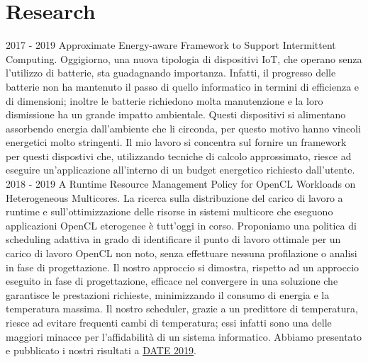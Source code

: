 \documentclass[letterpaper]{twentysecondcvit} %
\begin{document}
\section{Research}
\begin{twenty}
	\twentyitem
	{2017 - 2019}
	{}
	{Approximate Energy-aware Framework to Support Intermittent Computing.}
	{}
	{
	Oggigiorno, una nuova tipologia di dispositivi IoT, che operano senza l'utilizzo di batterie, sta guadagnando importanza. Infatti, il progresso delle batterie non ha mantenuto il passo di quello informatico in termini di efficienza e di dimensioni; inoltre le batterie richiedono molta manutenzione e la loro dismissione ha un grande impatto ambientale. Questi dispositivi si alimentano assorbendo energia dall'ambiente che li circonda, per questo motivo hanno vincoli energetici molto stringenti. Il mio lavoro si concentra sul fornire un framework per questi dispostivi che, utilizzando tecniche di calcolo approssimato, riesce ad eseguire un'applicazione all'interno di un budget energetico richiesto dall'utente.
	{
	}
	}
	{\footnotesize{}}
	\\
	\twentyitem
	{2018 - 2019}
	{}
	{A Runtime Resource Management Policy for OpenCL Workloads on Heterogeneous Multicores.}
	{}
	{
	La ricerca sulla distribuzione del carico di lavoro a runtime e sull’ottimizzazione delle risorse in sistemi multicore che eseguono applicazioni OpenCL eterogenee è tutt'oggi in corso. Proponiamo una politica di scheduling adattiva in grado di identificare il punto di lavoro ottimale per un carico di lavoro OpenCL non noto, senza effettuare nessuna profilazione o analisi in fase di progettazione. Il nostro approccio si dimostra, rispetto ad un approccio eseguito in fase di progettazione, efficace nel convergere in una soluzione che garantisce le prestazioni richieste, minimizzando il consumo di energia e la temperatura massima. Il nostro scheduler, grazie a un predittore di temperatura, riesce ad evitare frequenti cambi di temperatura; essi infatti sono una delle maggiori minacce per l'affidabilità di un sistema informatico. Abbiamo presentato e pubblicato i nostri risultati a \href{https://past.date-conference.com}{DATE 2019}.
	{
	}
	}
	{\footnotesize{}}

\end{twenty}
\end{document}

